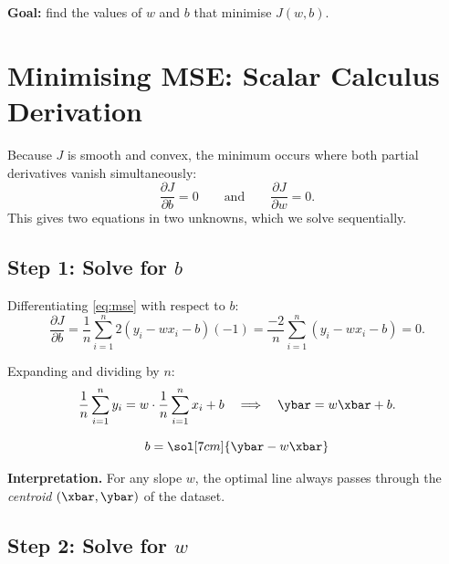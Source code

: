 \documentclass[12pt, a4paper]{article}
\begin{document}
\textbf{Goal:} find the values of $w$ and $b$ that minimise $J(w,b)$.


\section{Minimising MSE: Scalar Calculus Derivation}

Because $J$ is smooth and convex, the minimum occurs where both partial
derivatives vanish simultaneously:
\[
  \frac{\partial J}{\partial b} = 0
  \qquad \text{and} \qquad
  \frac{\partial J}{\partial w} = 0.
\]
This gives two equations in two unknowns, which we solve sequentially.

\subsection{Step 1: Solve for \texorpdfstring{$b$}{b}}

Differentiating \eqref{eq:mse} with respect to $b$:
\[
  \frac{\partial J}{\partial b}
  = \frac{1}{n}\sum_{i=1}^{n} 2(y_i - wx_i - b)(-1)
  = \frac{-2}{n}\sum_{i=1}^{n}(y_i - wx_i - b) = 0.
\]

Expanding and dividing by $n$:
\[
  \frac{1}{n}\sum_{i=1}^{n} y_i
  = w \cdot \frac{1}{n}\sum_{i=1}^{n} x_i + b
  \quad \Longrightarrow \quad
  \ybar = w\xbar + b.
\]

\begin{resultbox}
  \[
    b = \sol[7cm]{\ybar - w\xbar}
  \]
\end{resultbox}

\begin{notebox}
  \textbf{Interpretation.} For any slope $w$, the optimal line always passes
  through the \emph{centroid} $(\xbar, \ybar)$ of the dataset.
\end{notebox}

\subsection{Step 2: Solve for \texorpdfstring{$w$}{w}}
\end{document}
